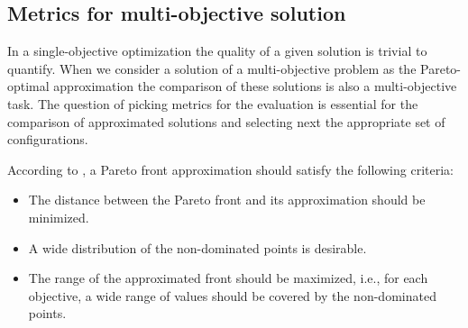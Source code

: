 
        \subsection{Metrics for multi-objective solution}
            In a single-objective optimization the quality of a given solution is trivial to quantify. When we consider a solution of a multi-objective problem as the Pareto-optimal approximation the comparison of these solutions is also a multi-objective task.
            The question of picking metrics for the evaluation is essential for the comparison of approximated solutions and selecting next the appropriate set of configurations.

            According to \cite{ZitzlerDT00}, a Pareto front approximation should satisfy the following criteria:
            \begin{itemize}
                \item The distance between the Pareto front and its approximation should be minimized.
                \item A wide distribution of the non-dominated points is desirable.
                \item The range of the approximated front should be maximized, i.e., for each objective, a wide range of values should be covered by the non-dominated points.
            \end{itemize}

